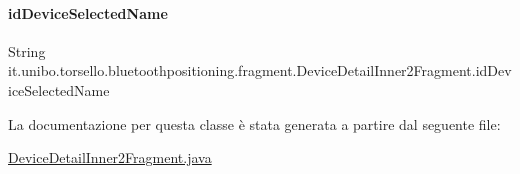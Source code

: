 \paragraph{\texorpdfstring{id\+Device\+Selected\+Name}{idDeviceSelectedName}}
{\footnotesize\ttfamily String it.\+unibo.\+torsello.\+bluetoothpositioning.\+fragment.\+Device\+Detail\+Inner2\+Fragment.\+id\+Device\+Selected\+Name\hspace{0.3cm}{\ttfamily [private]}}



La documentazione per questa classe è stata generata a partire dal seguente file\+:\begin{DoxyCompactItemize}
\item 
\hyperlink{DeviceDetailInner2Fragment_8java}{Device\+Detail\+Inner2\+Fragment.\+java}\end{DoxyCompactItemize}
